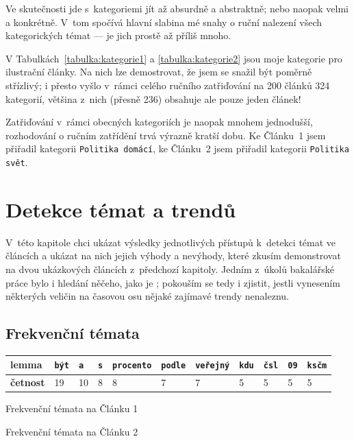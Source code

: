\documentclass[12pt,a4paper]{report}
\begin{document}
Ve skutečnosti jde s~kategoriemi jít až absurdně  a abstraktně; nebo naopak velmi  a konkrétně. V~tom spočívá hlavní slabina mé snahy o ruční nalezení všech kategorických témat --- je jich prostě až příliš mnoho.

V Tabulkách~\ref{tabulka:kategorie1} a \ref{tabulka:kategorie2} jsou moje kategorie pro ilustrační články. Na nich lze demostrovat, že jsem se snažil být poměrně střízlivý; i přesto vyšlo v~rámci celého ručního zatřiďování na 200 článků 324 kategorií, většina z~nich (přesně 236) obsahuje ale pouze jeden článek!

Zatřiďování v~rámci obecných kategoriích je naopak mnohem jednodušší, roz\-ho\-do\-vá\-ní o ručním zatřídění trvá výrazně kratší dobu. Ke Článku~1 jsem přiřadil kategorii \texttt{Politika domácí}, ke Článku~2 jsem přiřadil kategorii \texttt{Politika svět}.

\section{Detekce témat a trendů}
\label{sec:hledanitemat_prezentace_vysledku}

V~této kapitole chci ukázat výsledky jednotlivých přístupů k~detekci témat ve článcích a ukázat na nich jejich výhody a nevýhody, které zkusím demonstrovat na dvou ukázkových článcích z~předchozí kapitoly. Jedním z~úkolů bakalářské práce bylo i hledání něčeho, jako je ; pokouším se tedy i zjistit, jestli vynesením některých veličin na časovou osu nějaké zajímavé trendy nenaleznu. 


\subsection{Frekvenční témata}
\label{sec:ftemata}

{
 \begin{tabular}{ |l |l | l | l | l | l | l | l | l | l | l | }
        \hline
        \textbf{lemma} & \texttt{být} & \texttt{a} & \texttt{s} & \texttt{procento} & \texttt{podle} & \texttt{veřejný} & \texttt{kdu} & \texttt{čsl} & \texttt{09} & \texttt{ksčm} \\ \hline
        \textbf{četnost}  & 19 & 10 & 8 & 8 & 7 & 7 & 5 & 5 & 5 & 5 \\ \hline
\end{tabular}
} {Frekvenční témata na Článku 1} 

 {Frekvenční témata na Článku 2}
\end{document}
